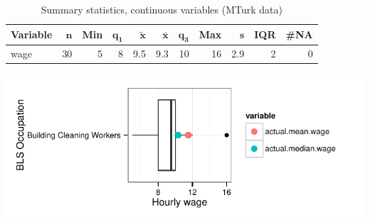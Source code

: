 \documentclass[a4paper,10pt]{article}\usepackage[]{graphicx}\usepackage[]{color}
\makeatletter
\def\maxwidth{ %
  \ifdim\Gin@nat@width>\linewidth
    \linewidth
  \else
    \Gin@nat@width
  \fi
}
\makeatother
\begin{document}
\begin{table}[ht]
\centering
{\footnotesize
\begin{tabular}{lrrrrrrrrrr}
 \textbf{Variable} & $\mathbf{n}$ & \textbf{Min} & $\mathbf{q_1}$ & $\mathbf{\widetilde{x}}$ & $\mathbf{\bar{x}}$ & $\mathbf{q_3}$ & \textbf{Max} & $\mathbf{s}$ & \textbf{IQR} & \textbf{\#NA} \\ 
  \hline
wage & 30 & 5 & 8 & 9.5 & 9.3 & 10 & 16 & 2.9 & 2 & 0 \\ 
  \end{tabular}
}
\caption{Summary statistics, continuous variables (MTurk data)} 
\label{tab2:37-2010}
\end{table}


{\centering \includegraphics[width=\maxwidth]{figure/unnamed-chunk-26} 

}
\end{document}

